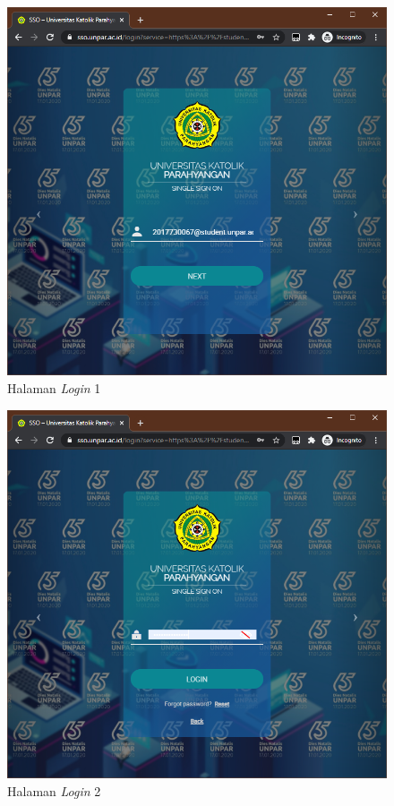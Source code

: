 \begin{figure}[H]
	\centering
	\includegraphics[scale=0.45]{Gambar/login_2.png}
	\caption{Halaman \textit{Login} 1} 
	\label{fig:3_login}
\end{figure}

\begin{figure}[H]
	\centering
	\includegraphics[scale=0.45]{Gambar/login_3.png}
	\caption{Halaman \textit{Login} 2} 
	\label{fig:3_login_2}
\end{figure}

